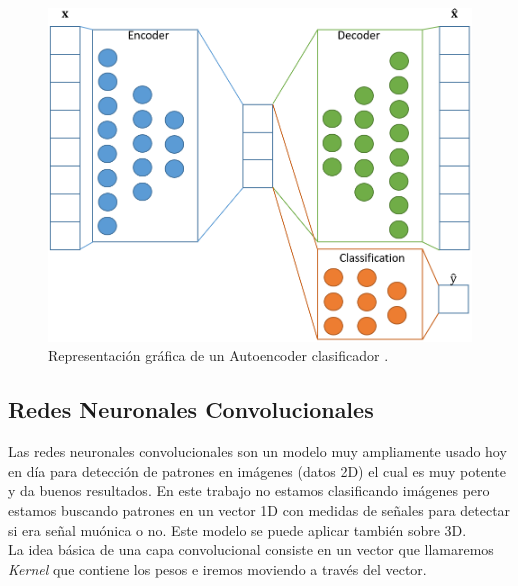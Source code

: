 \begin{figure}[H]
	\includegraphics[scale=0.3]{imagenes/03_Estado_del_arte/classifierautoencoder.png}
	\centering
	\caption{Representación gráfica de un Autoencoder clasificador \cite{bank2020autoencoders}.}
	\label{fig:classiferautoencoder}
\end{figure}

\subsection{Redes Neuronales Convolucionales}

Las redes neuronales convolucionales son un modelo muy ampliamente usado hoy en día para detección de patrones en imágenes (datos 2D) el cual es muy potente y da buenos resultados. En este trabajo no estamos clasificando imágenes pero estamos buscando patrones en un vector 1D con medidas de señales para detectar si era señal muónica o no. Este modelo se puede aplicar también sobre 3D.\\

La idea básica de una capa convolucional consiste en un vector que llamaremos \textit{Kernel} que contiene los pesos e iremos moviendo a través del vector.\\


